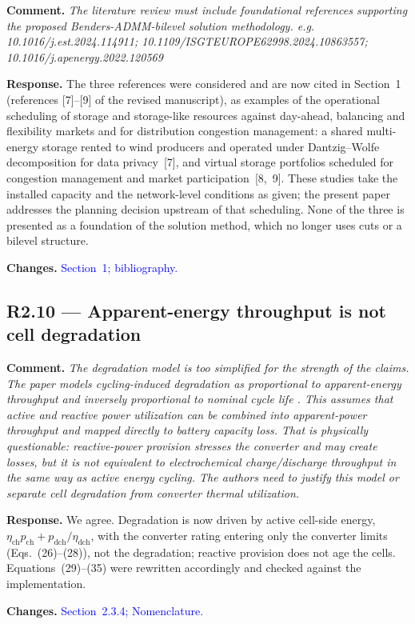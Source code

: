 \documentclass[11pt]{article}
\newcommand{\rcomment}[1]{\par\medskip\noindent\textbf{Comment.} \textit{#1}\par\smallskip}
\newcommand{\rresponse}[1]{\noindent\textbf{Response.} #1\par\smallskip}
\newcommand{\rchanges}[1]{\noindent\textbf{Changes.} \textcolor{blue}{#1}\par\medskip}
\begin{document}
\rcomment{
    The literature review must include foundational references supporting the proposed Benders-ADMM-bilevel solution methodology. e.g. 10.1016/j.est.2024.114911; 10.1109/ISGTEUROPE62998.2024.10863557; 10.1016/j.apenergy.2022.120569
}

\rresponse{
    The three references were considered and are now cited in Section~1 (references [7]--[9] of the revised manuscript), as examples of the operational scheduling of storage and storage-like resources against day-ahead, balancing and flexibility markets and for distribution congestion management: a shared multi-energy storage rented to wind producers and operated under Dantzig--Wolfe decomposition for data privacy~[7], and virtual storage portfolios scheduled for congestion management and market participation~[8,~9]. These studies take the installed capacity and the network-level conditions as given; the present paper addresses the planning decision upstream of that scheduling. None of the three is presented as a foundation of the solution method, which no longer uses cuts or a bilevel structure.
}

\rchanges{Section~1; bibliography.}

\subsection*{R2.10 --- Apparent-energy throughput is not cell degradation}
\rcomment{
The degradation model is too simplified for the strength of the claims. The paper models cycling-induced degradation as proportional to apparent-energy throughput and inversely proportional to nominal cycle life . This assumes that active and reactive power utilization can be combined into apparent-power throughput and mapped directly to battery capacity loss. That is physically questionable: reactive-power provision stresses the converter and may create losses, but it is not equivalent to electrochemical charge/discharge throughput in the same way as active energy cycling. The authors need to justify this model or separate cell degradation from converter thermal utilization.
}
\rresponse{We agree. Degradation is now driven by active cell-side energy,
$\eta_{\mathrm{ch}} p_{\mathrm{ch}} + p_{\mathrm{dch}}/\eta_{\mathrm{dch}}$, with the converter rating
entering only the converter limits (Eqs.~(26)--(28)), not the degradation; reactive provision does not age the cells.
Equations~(29)--(35) were rewritten accordingly and checked against the implementation.}
\rchanges{Section~2.3.4; Nomenclature.}
\end{document}
